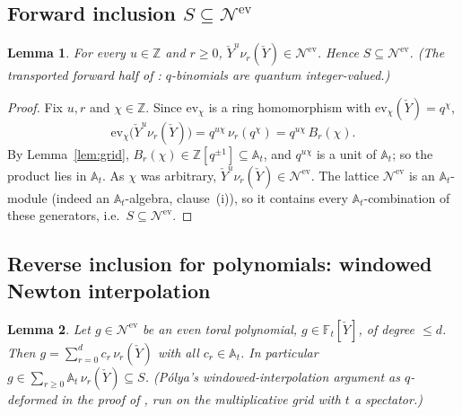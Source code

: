 \documentclass[11pt]{article}
\newtheorem{lemma}{Lemma}
\newcommand{\At}{\mathbb{A}_t}
\newcommand{\Ft}{\mathbb{F}_t}
\newcommand{\Nev}{\mathcal N^{\mathrm{ev}}}
\newcommand{\Yc}{\check Y}
\newcommand{\Z}{\mathbb Z}
\newcommand{\ev}{\mathrm{ev}}
\begin{document}
\subsection{Forward inclusion $S\subseteq\Nev$}

\begin{lemma}\label{lem:fwd}
For every $u\in\Z$ and $r\ge0$, $\Yc^{u}\nu_r(\Yc)\in\Nev$. Hence $S\subseteq\Nev$.
(The transported forward half of \cite[\S1]{HarmanHopkins}: $q$-binomials are
quantum integer-valued.)
\end{lemma}

\begin{proof}
Fix $u,r$ and $\chi\in\Z$. Since $\ev_\chi$ is a ring homomorphism with
$\ev_\chi(\Yc)=q^{\chi}$,
\[
  \ev_\chi\bigl(\Yc^{u}\nu_r(\Yc)\bigr)=q^{u\chi}\,\nu_r(q^{\chi})
  =q^{u\chi}\,B_r(\chi).
\]
By Lemma~\ref{lem:grid}, $B_r(\chi)\in\Z[q^{\pm1}]\subseteq\At$, and $q^{u\chi}$
is a unit of $\At$; so the product lies in $\At$. As $\chi$ was arbitrary,
$\Yc^{u}\nu_r(\Yc)\in\Nev$. The lattice $\Nev$ is an $\At$-module (indeed an
$\At$-algebra, clause~(i)), so it contains every $\At$-combination of these
generators, i.e.\ $S\subseteq\Nev$.
\end{proof}

\subsection{Reverse inclusion for polynomials: windowed Newton interpolation}

\begin{lemma}\label{lem:rev}
Let $g\in\Nev$ be an even toral \emph{polynomial}, $g\in\Ft[\Yc]$, of degree
$\le d$. Then $g=\sum_{r=0}^{d}c_r\,\nu_r(\Yc)$ with all $c_r\in\At$. In
particular $g\in\sum_{r\ge0}\At\,\nu_r(\Yc)\subseteq S$.
(P\'olya's windowed-interpolation argument as $q$-deformed in the proof of
\cite[\S1]{HarmanHopkins}, run on the multiplicative grid with $t$ a
spectator.)
\end{lemma}
\end{document}

